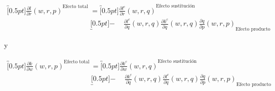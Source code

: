 \documentclass[8pt,a4paper]{extarticle}
\begin{document}
\begin{multicols}{3}
\begin{boxtheo}
	\begin{equation*}
	\begin{aligned}
		\overbracket[0.5pt]{\frac{\partial l}{\partial r} (w, r, p)}^{\text{Efecto total}} \quad &= \overbracket[0.5pt]{\frac{\partial l^c}{\partial r} (w, r, q)}^{\text{Efecto sustitución}} \\
																						& \underbracket[0.5pt]{ - \quad\ \frac{\partial l^c}{\partial q} (w ,r, q) \frac{\partial k^c}{\partial q} (w, r, q) \frac{\partial q}{\partial p} (w, r, p)}_{\text{Efecto producto}}
	\end{aligned}
	\end{equation*}
	
	y

	\begin{equation*}
	\begin{aligned}
		\overbracket[0.5pt]{\frac{\partial k}{\partial w} (w, r, p)}^{\text{Efecto total}} \quad &= \overbracket[0.5pt]{\frac{\partial k^c}{\partial w} (w, r, q)}^{\text{Efecto sustitución}} \\
																						& \underbracket[0.5pt]{ - \quad\ \frac{\partial k^c}{\partial q} (w ,r, q) \frac{\partial l^c}{\partial q} (w, r, q) \frac{\partial q}{\partial p} (w, r, p)}_{\text{Efecto producto}}
	\end{aligned}
	\end{equation*}
	
\end{boxtheo}

\vfill\eject
\columnbreak
\end{multicols}
\end{document}
